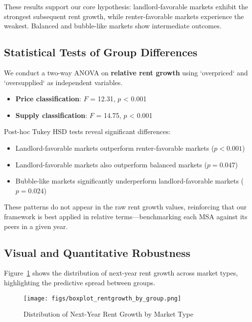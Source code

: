\documentclass[sn-mathphys-num]{sn-jnl}%
\theoremstyle{thmstyleone}%
\theoremstyle{thmstyletwo}%
\theoremstyle{thmstylethree}%
\begin{document}
These results support our core hypothesis: landlord-favorable markets exhibit the strongest subsequent rent growth, while renter-favorable markets experience the weakest. Balanced and bubble-like markets show intermediate outcomes.

\subsection{Statistical Tests of Group Differences}

We conduct a two-way ANOVA on \textbf{relative rent growth} using `overpriced` and `oversupplied` as independent variables.

\begin{itemize}
	\item \textbf{Price classification}: $F$ = 12.31, $p$ < 0.001
	\item \textbf{Supply classification}: $F$ = 14.75, $p$ < 0.001
\end{itemize}

Post-hoc Tukey HSD tests reveal significant differences:
\begin{itemize}
	\item Landlord-favorable markets outperform renter-favorable markets (\( p < 0.001 \))
	\item Landlord-favorable markets also outperform balanced markets (\( p = 0.047 \))
	\item Bubble-like markets significantly underperform landlord-favorable markets (\( p = 0.024 \))
\end{itemize}

These patterns do not appear in the raw rent growth values, reinforcing that our framework is best applied in relative terms—benchmarking each MSA against its peers in a given year.

\subsection{Visual and Quantitative Robustness}

Figure~\ref{fig:boxplot_group_rentgrowth} shows the distribution of next-year rent growth across market types, highlighting the predictive spread between groups.

\begin{figure}[h!]
	\centering
	\texttt{[image: figs/boxplot\_rentgrowth\_by\_group.png]}
	\caption{Distribution of Next-Year Rent Growth by Market Type}
	\label{fig:boxplot_group_rentgrowth}
\end{figure}
\end{document}
